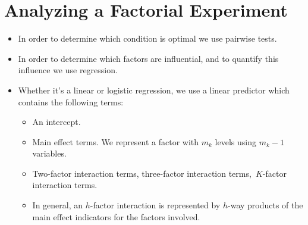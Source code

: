 \section{Analyzing a Factorial Experiment}
\begin{itemize}
      \item In order to determine which condition is optimal we use pairwise tests.
      \item In order to determine which factors are influential, and to quantify this influence we use regression.
      \item Whether it's a linear or logistic regression, we use a linear predictor which contains the following terms:
            \begin{itemize}
                  \item An intercept.
                  \item Main effect terms. We represent a factor with $ m_k $ levels using $ m_k-1 $ variables.
                  \item Two-factor interaction terms, three-factor interaction terms,\textellipsis\ $ K $-factor interaction terms.
                  \item In general, an $ h $-factor interaction is represented by $ h $-way products of the main effect indicators for the factors involved.
            \end{itemize}
\end{itemize}
